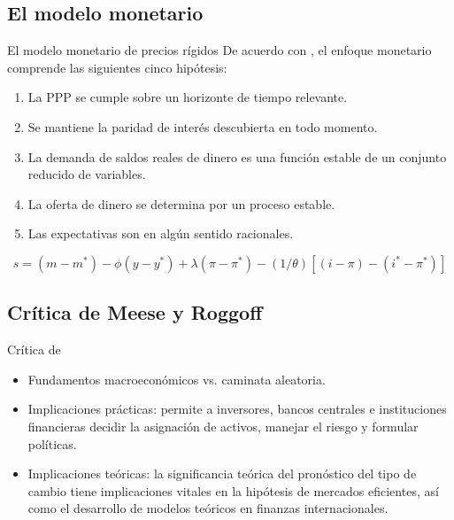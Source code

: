 \documentclass{beamer}
\begin{document}
\subsection{El modelo monetario}
\begin{frame}{El modelo monetario de precios rígidos}
	De acuerdo con \textcite{boughton1988monetary}, el enfoque monetario comprende las siguientes cinco hipótesis: 
	\begin{enumerate}
		\item La PPP se cumple sobre un horizonte de tiempo relevante.
		\item Se mantiene la paridad de interés descubierta en todo momento.
		\item La demanda de saldos reales de dinero es una función estable de un conjunto reducido de variables.
		\item La oferta de dinero se determina por un proceso estable.
		\item Las expectativas son en algún sentido racionales.
	\end{enumerate}
	
	\begin{equation}
	s = (m - m^*) - \phi (y-y^*) + \lambda (\pi - \pi^*) - (1/\theta)[(i-\pi) - (i^* - \pi^*)]
	\label{spma}
	\end{equation}
\end{frame}

\subsection{Crítica de Meese y Roggoff}

\begin{frame}{Crítica de \textcite{meese1983empirical}}
	\begin{itemize}
		\item Fundamentos macroeconómicos vs. caminata aleatoria.
		
		\item Implicaciones prácticas: permite a inversores, bancos centrales e instituciones financieras decidir la asignación de activos, manejar el riesgo y formular políticas.
		
		\item Implicaciones teóricas: la significancia teórica del pronóstico del tipo de cambio tiene implicaciones vitales en la hipótesis de mercados eficientes, así como el desarrollo de modelos teóricos en finanzas internacionales.
	\end{itemize}
\end{frame}
\end{document}
